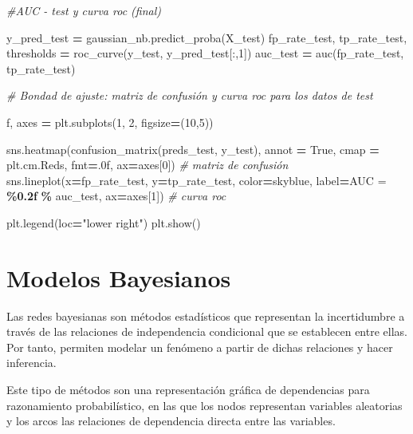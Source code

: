 \documentclass[
  a4paper,
  DIV=11,
  numbers=noendperiod]{scrreprt}
\newenvironment{Shaded}{\begin{snugshade}}{\end{snugshade}}
\newcommand{\CommentTok}[1]{\textcolor[rgb]{0.56,0.35,0.01}{\textit{#1}}}
\newcommand{\DecValTok}[1]{\textcolor[rgb]{0.00,0.00,0.81}{#1}}
\newcommand{\NormalTok}[1]{#1}
\newcommand{\OperatorTok}[1]{\textcolor[rgb]{0.81,0.36,0.00}{\textbf{#1}}}
\newcommand{\SpecialCharTok}[1]{\textcolor[rgb]{0.81,0.36,0.00}{\textbf{#1}}}
\newcommand{\StringTok}[1]{\textcolor[rgb]{0.31,0.60,0.02}{#1}}
\newcommand{\VariableTok}[1]{\textcolor[rgb]{0.00,0.00,0.00}{#1}}
\begin{document}
\begin{Shaded}
\begin{Highlighting}[numbers=left,,]
\CommentTok{\#AUC {-} test y curva roc (final)}

\NormalTok{y\_pred\_test }\OperatorTok{=}\NormalTok{ gaussian\_nb.predict\_proba(X\_test)}
\NormalTok{fp\_rate\_test, tp\_rate\_test, thresholds }\OperatorTok{=}\NormalTok{ roc\_curve(y\_test, y\_pred\_test[:,}\DecValTok{1}\NormalTok{])}
\NormalTok{auc\_test }\OperatorTok{=}\NormalTok{ auc(fp\_rate\_test, tp\_rate\_test)}

\CommentTok{\# Bondad de ajuste: matriz de confusión y curva roc para los datos de test}

\NormalTok{f, axes }\OperatorTok{=}\NormalTok{ plt.subplots(}\DecValTok{1}\NormalTok{, }\DecValTok{2}\NormalTok{, figsize}\OperatorTok{=}\NormalTok{(}\DecValTok{10}\NormalTok{,}\DecValTok{5}\NormalTok{))}

\NormalTok{sns.heatmap(confusion\_matrix(preds\_test, y\_test), annot }\OperatorTok{=} \VariableTok{True}\NormalTok{, cmap }\OperatorTok{=}\NormalTok{ plt.cm.Reds, fmt}\OperatorTok{=}\StringTok{\textquotesingle{}.0f\textquotesingle{}}\NormalTok{, ax}\OperatorTok{=}\NormalTok{axes[}\DecValTok{0}\NormalTok{]) }\CommentTok{\# matriz de confusión}
\NormalTok{sns.lineplot(x}\OperatorTok{=}\NormalTok{fp\_rate\_test, y}\OperatorTok{=}\NormalTok{tp\_rate\_test, color}\OperatorTok{=}\StringTok{\textquotesingle{}skyblue\textquotesingle{}}\NormalTok{, label}\OperatorTok{=}\StringTok{\textquotesingle{}AUC = }\SpecialCharTok{\%0.2f}\StringTok{\textquotesingle{}} \OperatorTok{\%}\NormalTok{ auc\_test, ax}\OperatorTok{=}\NormalTok{axes[}\DecValTok{1}\NormalTok{]) }\CommentTok{\# curva roc}

\NormalTok{plt.legend(loc}\OperatorTok{=}\StringTok{"lower right"}\NormalTok{)}
\NormalTok{plt.show()}
\end{Highlighting}
\end{Shaded}

\section{Modelos Bayesianos}\label{modelos-bayesianos}

Las redes bayesianas son métodos estadísticos que representan la
incertidumbre a través de las relaciones de independencia condicional
que se establecen entre ellas. Por tanto, permiten modelar un fenómeno a
partir de dichas relaciones y hacer inferencia.

Este tipo de métodos son una representación gráfica de dependencias para
razonamiento probabilístico, en las que los nodos representan variables
aleatorias y los arcos las relaciones de dependencia directa entre las
variables.
\end{document}
